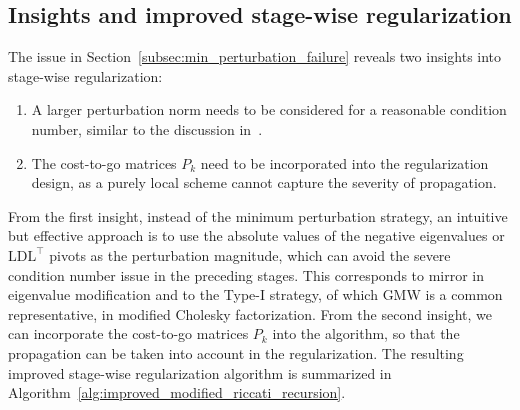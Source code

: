 \documentclass[class=scrbook, crop=false]{standalone}
\begin{document}
\subsection{Insights and improved stage-wise regularization}
\label{subsec:improved_stage_reg}
The issue in Section~\ref{subsec:min_perturbation_failure} reveals two insights into stage-wise regularization:
\begin{enumerate}
    \item A larger perturbation norm needs to be considered for a reasonable condition number, 
    similar to the discussion in~\cite{gill1981practical}.
    \item The cost-to-go matrices $P_k$ need to be incorporated into the regularization design, 
    as a purely local scheme cannot capture the severity of propagation.
\end{enumerate}
From the first insight, instead of the minimum perturbation strategy, an intuitive but effective approach is 
to use the absolute values of the negative eigenvalues or $\mathrm{LDL}^\top$ pivots as the perturbation magnitude,
which can avoid the severe condition number issue in the preceding stages.
This corresponds to mirror in eigenvalue modification 
and to the Type-I strategy, of which \gls{GMW} is a common representative, in modified Cholesky factorization.
From the second insight, we can incorporate the cost-to-go matrices $P_k$ into the algorithm,
so that the propagation can be taken into account in the regularization.
The resulting improved stage-wise regularization algorithm is summarized in Algorithm~\ref{alg:improved_modified_riccati_recursion}.
\end{document}
